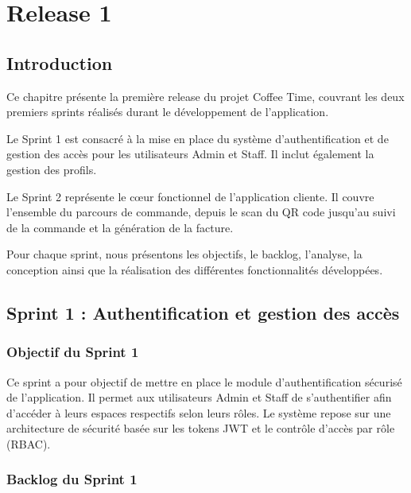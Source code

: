 \chapter{Release 1}

\section{Introduction}

Ce chapitre présente la première release du projet Coffee Time, couvrant les deux premiers sprints réalisés durant le développement de l'application.

Le Sprint 1 est consacré à la mise en place du système d'authentification et de gestion des accès pour les utilisateurs Admin et Staff. Il inclut également la gestion des profils.

Le Sprint 2 représente le cœur fonctionnel de l'application cliente. Il couvre l'ensemble du parcours de commande, depuis le scan du QR code jusqu'au suivi de la commande et la génération de la facture.

Pour chaque sprint, nous présentons les objectifs, le backlog, l'analyse, la conception ainsi que la réalisation des différentes fonctionnalités développées.

\section{Sprint 1 : Authentification et gestion des accès}

\subsection{Objectif du Sprint 1}

Ce sprint a pour objectif de mettre en place le module d'authentification sécurisé de l'application. Il permet aux utilisateurs Admin et Staff de s'authentifier afin d'accéder à leurs espaces respectifs selon leurs rôles. Le système repose sur une architecture de sécurité basée sur les tokens JWT et le contrôle d'accès par rôle (RBAC).

\subsection{Backlog du Sprint 1}

